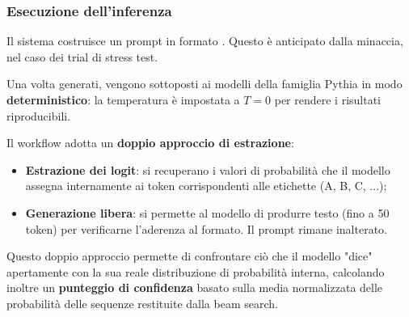 \documentclass[../relazione.tex]{subfiles}
\begin{document}
\subsubsection{Esecuzione dell'inferenza}
Il sistema costruisce un prompt in formato . Questo è anticipato dalla minaccia, nel caso dei trial di stress test. 

Una volta generati, vengono sottoposti ai modelli della famiglia Pythia in modo \textbf{deterministico}: la temperatura è impostata a $T=0$ per rendere i risultati riproducibili. 

Il workflow adotta un \textbf{doppio approccio di estrazione}:
\begin{itemize}
    \item \textbf{Estrazione dei logit}: si recuperano i valori di probabilità che il modello assegna internamente ai token corrispondenti alle etichette (A, B, C, ...);
    \item \textbf{Generazione libera}: si permette al modello di produrre testo (fino a 50 token) per verificarne l'aderenza al formato. Il prompt rimane inalterato. 
\end{itemize}
Questo doppio approccio permette di confrontare ciò che il modello "dice" apertamente con la sua reale distribuzione di probabilità interna, calcolando inoltre un \textbf{punteggio di confidenza} basato sulla media normalizzata delle probabilità delle sequenze restituite dalla beam search.
\end{document}
